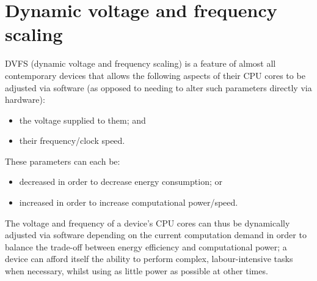 \section{Dynamic voltage and frequency scaling}

DVFS (dynamic voltage and frequency scaling) is a feature of almost all
contemporary devices that allows the following aspects of their CPU cores to be
adjusted via software (as opposed to needing to alter such parameters directly
via hardware):
\begin{itemize}
    \item the voltage supplied to them; and
    \item their frequency/clock speed.
\end{itemize}

These parameters can each be:
\begin{itemize}
    \item decreased in order to decrease energy consumption; or
    \item increased in order to increase computational power/speed.
\end{itemize}

The voltage and frequency of a device's CPU cores can thus be dynamically
adjusted via software depending on the current computation demand in order to
balance the trade-off between energy efficiency and computational power; a
device can afford itself the ability to perform complex, labour-intensive tasks
when necessary, whilst using as little power as possible at other times.

